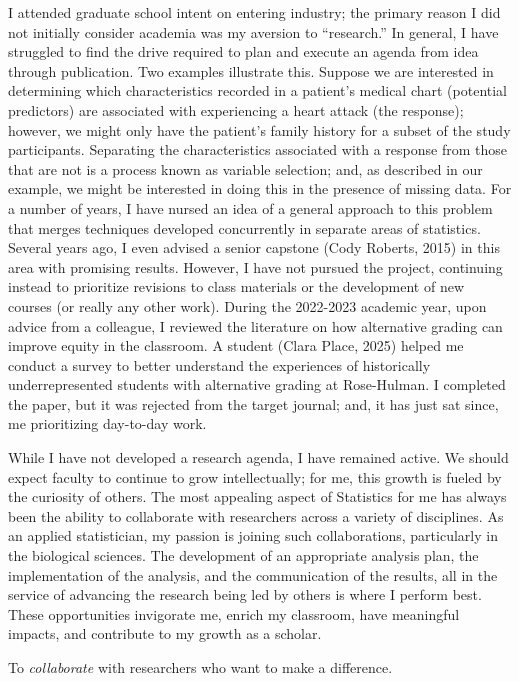 \documentclass[
  letterpaper,
  DIV=11,
  numbers=noendperiod]{scrreprt}
\begin{document}
I attended graduate school intent on entering industry; the primary
reason I did not initially consider academia was my aversion to
``research.'' In general, I have struggled to find the drive required to
plan and execute an agenda from idea through publication. Two examples
illustrate this. Suppose we are interested in determining which
characteristics recorded in a patient's medical chart (potential
predictors) are associated with experiencing a heart attack (the
response); however, we might only have the patient's family history for
a subset of the study participants. Separating the characteristics
associated with a response from those that are not is a process known as
variable selection; and, as described in our example, we might be
interested in doing this in the presence of missing data. For a number
of years, I have nursed an idea of a general approach to this problem
that merges techniques developed concurrently in separate areas of
statistics. Several years ago, I even advised a senior capstone (Cody
Roberts, 2015) in this area with promising results. However, I have not
pursued the project, continuing instead to prioritize revisions to class
materials or the development of new courses (or really any other work).
During the 2022-2023 academic year, upon advice from a colleague, I
reviewed the literature on how alternative grading can improve equity in
the classroom. A student (Clara Place, 2025) helped me conduct a survey
to better understand the experiences of historically underrepresented
students with alternative grading at Rose-Hulman. I completed the paper,
but it was rejected from the target journal; and, it has just sat since,
me prioritizing day-to-day work.

While I have not developed a research agenda, I have remained active. We
should expect faculty to continue to grow intellectually; for me, this
growth is fueled by the curiosity of others. The most appealing aspect
of Statistics for me has always been the ability to collaborate with
researchers across a variety of disciplines. As an applied statistician,
my passion is joining such collaborations, particularly in the
biological sciences. The development of an appropriate analysis plan,
the implementation of the analysis, and the communication of the
results, all in the service of advancing the research being led by
others is where I perform best. These opportunities invigorate me,
enrich my classroom, have meaningful impacts, and contribute to my
growth as a scholar.

\begin{tcolorbox}[enhanced jigsaw, coltitle=black, colframe=quarto-callout-important-color-frame, opacityback=0, rightrule=.15mm, bottomrule=.15mm, leftrule=.75mm, bottomtitle=1mm, colbacktitle=quarto-callout-important-color!10!white, breakable, titlerule=0mm, title=\textcolor{quarto-callout-important-color}{\faExclamation}\hspace{0.5em}{My Professional Mission as a Collaborator}, left=2mm, toptitle=1mm, toprule=.15mm, colback=white, arc=.35mm, opacitybacktitle=0.6]

To \emph{collaborate} with researchers who want to make a difference.

\end{tcolorbox}
\end{document}

